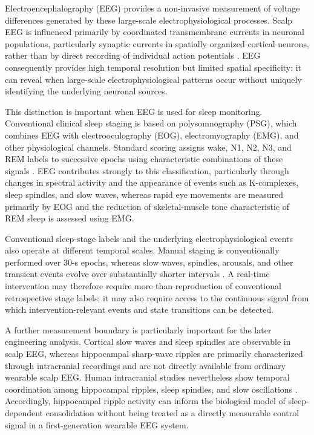 Electroencephalography (EEG) provides a non-invasive measurement of voltage
differences generated by these large-scale electrophysiological processes.
Scalp EEG is influenced primarily by coordinated transmembrane currents in
neuronal populations, particularly synaptic currents in spatially organized
cortical neurons, rather than by direct recording of individual action
potentials \citep{buzsaki2012origin}. EEG consequently provides high temporal
resolution but limited spatial specificity: it can reveal when large-scale
electrophysiological patterns occur without uniquely identifying the underlying
neuronal sources.

This distinction is important when EEG is used for sleep monitoring.
Conventional clinical sleep staging is based on polysomnography (PSG), which
combines EEG with electrooculography (EOG), electromyography (EMG), and other
physiological channels. Standard scoring assigns wake, N1, N2, N3, and REM
labels to successive epochs using characteristic combinations of these signals
\citep{silber2007scoring}. EEG contributes strongly to this classification,
particularly through changes in spectral activity and the appearance of events
such as K-complexes, sleep spindles, and slow waves, whereas rapid eye
movements are measured primarily by EOG and the reduction of skeletal-muscle
tone characteristic of REM sleep is assessed using EMG.

Conventional sleep-stage labels and the underlying electrophysiological events
also operate at different temporal scales. Manual staging is conventionally
performed over 30-s epochs, whereas slow waves, spindles, arousals, and other
transient events evolve over substantially shorter intervals
\citep{silber2007scoring}. A real-time intervention may therefore require more
than reproduction of conventional retrospective stage labels; it may also
require access to the continuous signal from which intervention-relevant events
and state transitions can be detected.

A further measurement boundary is particularly important for the later
engineering analysis. Cortical slow waves and sleep spindles are observable in
scalp EEG, whereas hippocampal sharp-wave ripples are primarily characterized
through intracranial recordings and are not directly available from ordinary
wearable scalp EEG. Human intracranial studies nevertheless show temporal
coordination among hippocampal ripples, sleep spindles, and slow oscillations
\citep{staresina2015nesting}. Accordingly, hippocampal ripple activity can
inform the biological model of sleep-dependent consolidation without being
treated as a directly measurable control signal in a first-generation wearable
EEG system.

